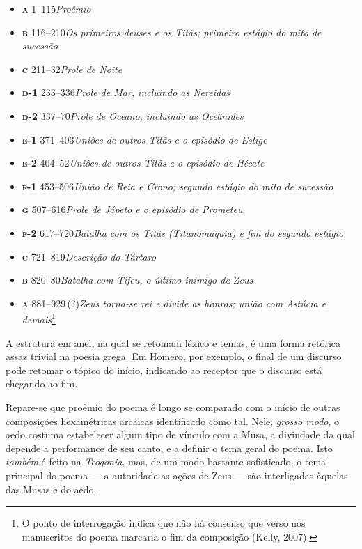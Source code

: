 \begin{itemize}
\item \textbf{\textsc{a}} 1--115\quad \textit{Proêmio}
\item \textbf{\textsc{b}} 116--210\quad \textit{Os primeiros deuses e os Titãs; primeiro estágio do mito de sucessão}
\item \textbf{\textsc{c}} 211--32\quad \textit{Prole de Noite}
\item \textbf{\textsc{d-1}} 233--336\quad \textit{Prole de Mar, incluindo as Nereidas}
\item \textbf{\textsc{d-2}} 337--70\quad \textit{Prole de Oceano, incluindo as Oceânides}
\item \textbf{\textsc{e-1}} 371--403\quad \textit{Uniões de outros Titãs e o episódio de Estige}
\item \textbf{\textsc{e-2}} 404--52\quad \textit{Uniões de outros Titãs e o episódio de Hécate}
\item \textbf{\textsc{f-1}} 453--506\quad \textit{União de Reia e Crono; segundo estágio do mito de sucessão}
\item \textbf{\textsc{g}} 507--616\quad \textit{Prole de Jápeto e o episódio de Prometeu}
\item \textbf{\textsc{f-2}} 617--720\quad \textit{Batalha com os Titãs (Titanomaquia) e fim do segundo estágio}
\item \textbf{\textsc{c}} 721--819\quad \textit{Descrição do Tártaro}
\item \textbf{\textsc{b}} 820--80\quad \textit{Batalha com Tifeu, o último inimigo de Zeus}
\item \textbf{\textsc{a}} 881--929\,(?)\quad \textit{Zeus torna-se rei e divide as honras; união com Astúcia e demais}\footnote{O ponto de interrogação indica que não há consenso que verso nos manuscritos do poema marcaria o fim da composição (Kelly, 2007).} 
\end{itemize}

A estrutura em anel, na qual se retomam léxico e temas, é uma forma
retórica assaz trivial na poesia grega. Em Homero, por exemplo, o final
de um discurso pode retomar o tópico do início, indicando ao receptor
que o discurso está chegando ao fim.

Repare-se que proêmio do poema é longo se comparado com o início de
outras composições hexamétricas arcaicas identificado como tal. Nele,
\textit{grosso modo}, o aedo costuma estabelecer algum tipo de vínculo com
a Musa, a divindade da qual depende a performance de seu canto, e a
definir o tema geral do poema. Isto \textit{também} é feito na
\textit{Teogonia}, mas, de um modo bastante sofisticado, o tema principal
do poema --- a autoridade as ações de Zeus --- são interligadas àquelas
das Musas e do aedo.

